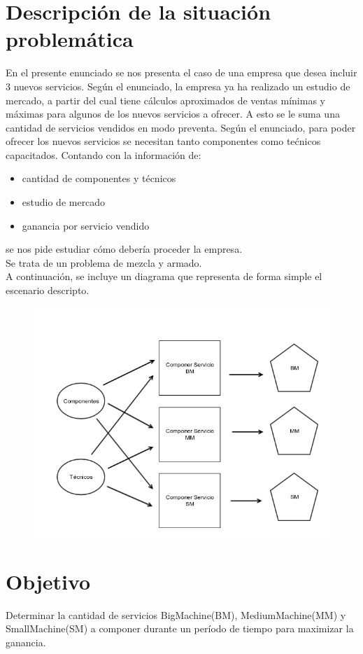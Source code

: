 \documentclass{article}
\begin{document}
\part{Descripci\'on de la situaci\'on problem\'atica}
En el presente enunciado se nos presenta el caso de una empresa que desea incluir 3 nuevos servicios. Seg\'un el enunciado, la empresa ya ha realizado un estudio de mercado, a partir del cual tiene c\'alculos aproximados de ventas m\'inimas y m\'aximas para algunos de los nuevos servicios a ofrecer. A esto se le suma una cantidad de servicios vendidos en modo preventa. 
Seg\'un el enunciado, para poder ofrecer los nuevos servicios se necesitan tanto componentes como te\'cnicos capacitados. Contando con la informaci\'on de:
\begin{itemize}
	\item cantidad de componentes y t\'ecnicos
	\item estudio de mercado
	\item ganancia por servicio vendido
\end{itemize}
se nos pide estudiar c\'omo deber\'ia proceder la empresa. \\
Se trata de un problema de mezcla y armado.\\
A continuaci\'on, se incluye un diagrama que representa de forma simple el escenario descripto. 
\begin{figure}[h!]
	\includegraphics[scale=0.5]{tp_myo.png}
\end{figure}

\part{Objetivo}
Determinar la cantidad de servicios BigMachine(BM), MediumMachine(MM) y SmallMachine(SM) a componer durante un per\'iodo de tiempo para maximizar la ganancia.
\end{document}
